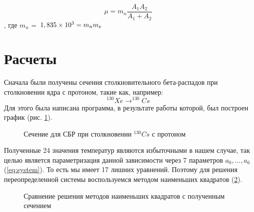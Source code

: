 \documentclass[%
master,    %
natbib,      %
subf,        %
href,        %
colorlinks,  %
]{disser}
\begin{document}
\begin{equation}
\mu = m_n \frac{A_1 A_2}{A_1 + A_2}
\end{equation}
, где $m_n$ = $1,835\times10^3 = m_n\\m_e$
\section{Расчеты}
Сначала были получены сечения столкновительного бета-распадов при столкновении ядра с протоном, такие как, например:
$$^{130}Xe \to ^{130}Cs$$
Для этого была написана программа, в результате работы которой, был построен график (рис. \ref{ris:1}).
\begin{figure}[h]
	\caption{Сечение для СБР при столкновении $^{130}Cs$ с протоном}
	\label{ris:1}
\end{figure}
Полученные 24 значения температур являются избыточными в нашем случае, так целью является параметризация данной зависимости через 7 параметров $a_0, ..., a_6$ (\ref{eq:system}). То есть мы имеет 17 лишних уравнений. Поэтому для решения переопределенной системы воспользуемся методом наименьших квадратов (\ref{ris:2}).

\begin{figure}[h]
	\caption{Сравнение решения методов наименьших квадратов с полученным сечением}
	\label{ris:2}
\end{figure}
\end{document}
